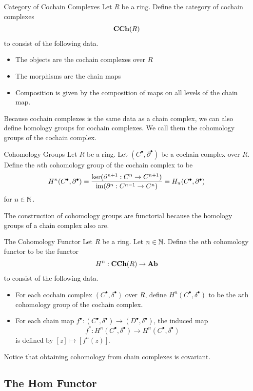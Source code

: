 \documentclass[a4paper]{article}
\begin{document}
\begin{defn}{Category of Cochain Complexes}{} Let $R$ be a ring. Define the category of cochain complexes $$\bold{CCh}(R)$$ to consist of the following data. 
\begin{itemize}
\item The objects are the cochain complexes over $R$
\item The morphisms are the chain maps
\item Composition is given by the composition of maps on all levels of the chain map. 
\end{itemize}
\end{defn}

Because cochain complexes is the same data as a chain complex, we can also define homology groups for cochain complexes. We call them the cohomology groups of the cochain complex. 

\begin{defn}{Cohomology Groups}{} Let $R$ be a ring. Let $(C^\bullet,\partial^\bullet)$ be a cochain complex over $R$. Define the $n$th cohomology group of the cochain complex to be $$H^n(C^\bullet,\partial^\bullet)=\frac{\ker(\partial^{n+1}:C^n\to C^{n+1})}{\operatorname{im}(\partial^n:C^{n-1}\to C^n)}=H_n(C^\bullet,\partial^\bullet)$$ for $n\in\mathbb{N}$. 
\end{defn}

The construction of cohomology groups are functorial because the homology groups of a chain complex also are. 

\begin{defn}{The Cohomology Functor}{} Let $R$ be a ring. Let $n\in\mathbb{N}$. Define the $n$th cohomology functor to be the functor $$H^n:\bold{CCh}(R)\to\bold{Ab}$$ to consist of the following data. 
\begin{itemize}
\item For each cochain complex $(C^\bullet,\delta^\bullet)$ over $R$, define $H^n(C^\bullet,\delta^\bullet)$ to be the $n$th cohomology group of the cochain complex. 
\item For each chain map $f^\bullet:(C^\bullet,\delta^\bullet)\to(D^\bullet,\delta^\bullet)$, the induced map $$f^\ast:H^n(C^\bullet,\delta^\bullet)\to H^n(C^\bullet,\delta^\bullet)$$ is defined by $[z]\mapsto[f^n(z)]$. 
\end{itemize}
\end{defn}

Notice that obtaining cohomology from chain complexes is covariant. 

\subsection{The Hom Functor}
\end{document}
